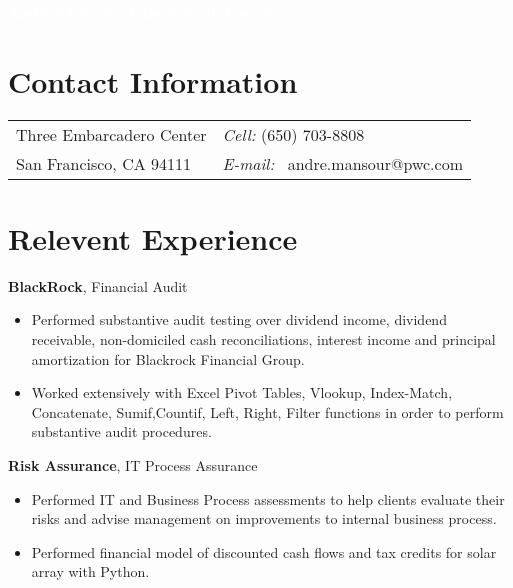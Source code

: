 \documentclass[margin,line]{res2}
\begin{document}
\begin{resume}
\begin{tcolorbox}
{\textcolor{white}{\textbf{Andre Mansour, Experienced Associate} \vspace*{0in}}}
\end{tcolorbox}
\section{\sc Contact Information}
\vspace{.05in}
\begin{tabular}{@{}p{2in}p{4in}}
Three Embarcadero Center  & {\it Cell:}  (650) 703-8808 \\  
San Francisco, CA 94111 & {\it E-mail:}  {\ andre.mansour@pwc.com} \\              
\end{tabular}


\section{\sc Relevent Experience}

{\bf BlackRock}, Financial Audit

\renewcommand\labelitemi{\tiny$\bullet$}

\begin{itemize}[leftmargin=-.13in]
\item Performed substantive audit testing over dividend income, dividend receivable, non-domiciled cash reconciliations, interest income and principal amortization for Blackrock Financial Group.
\item Worked extensively with Excel Pivot Tables, Vlookup, Index-Match, Concatenate, Sumif,Countif, Left, Right, Filter functions in order to perform substantive audit procedures. 
\end{itemize}
\vspace*{1.5mm}

{\bf Risk Assurance}, IT Process Assurance
\begin{itemize}[leftmargin=-.13in]
\item Performed IT and Business Process assessments to help clients evaluate their risks and advise management on improvements to internal business process. 
\item Performed financial model of discounted cash flows and tax credits for solar array with Python.    
\end{itemize}



\end{resume}
\end{document}
